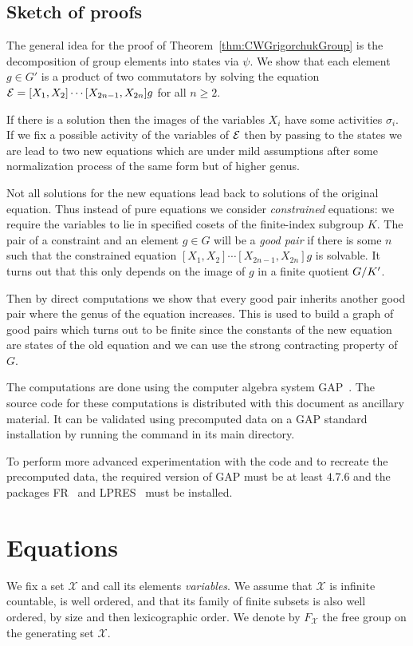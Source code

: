 \documentclass[a4paper,11pt]{amsart}
\begin{document}
\subsection{Sketch of proofs}
The general idea for the proof of Theorem~\ref{thm:CWGrigorchukGroup}
is the decomposition of group elements into states via $\psi$. We show
that each element $g\in G'$ is a product of two commutators by solving
the equation $\mathcal{E}=[X_1,X_2]\cdots[X_{2n-1},X_{2n}]g$ for all
$n\geq 2$.

If there is a solution then the images of the variables $X_i$ have some 
activities $\sigma_i$. If we fix a possible activity
of the variables of $\mathcal{E}$ then by passing to the states we are lead to two new
equations which are under mild assumptions after some normalization process
of the same form but of higher genus. 

Not all solutions for the new equations lead back to solutions 
of the original equation. Thus instead of pure equations we consider
\emph{constrained} equations: we require the variables to lie in specified cosets of the finite-index subgroup $K$. The pair of a constraint and an element $g\in G$ 
will be a \emph{good pair} if there is some $n$ such that the 
constrained equation $[X_1,X_2]\cdots[X_{2n-1},X_{2n}]g$ is solvable.
It turns out that this only depends on the image of $g$ in a finite
quotient ${G/K'}$. 

Then by direct computations we show that every good pair inherits
another good pair where the genus of the equation increases.
This is used to build a graph of good pairs which turns out 
to be finite since the constants of the new equation are states
of the old equation and we can use the strong contracting property
of $G$. 

The computations are done
 using the computer algebra system GAP~\cite{GAP4}. The source
code for these computations is distributed with this document as
ancillary material. It can be validated using precomputed data on a
GAP standard installation by running the command  in its main directory.

To perform more advanced experimentation with the code and to recreate
the precomputed data, the required version of GAP must be at least
$4.7.6$ and the packages FR~\cite{FR2.3.6} and LPRES~\cite{LPRES0.3.0}
must be installed.

\section{Equations}
We fix a set $\mathcal{X}$ and call its elements \emph{variables}.  We
assume that $\mathcal{X}$ is infinite countable, is well ordered, and
that its family of finite subsets is also well ordered, by size and
then lexicographic order. We denote by $F_{\mathcal{X}}$ the free
group on the generating set $\mathcal{X}$.
\end{document}
